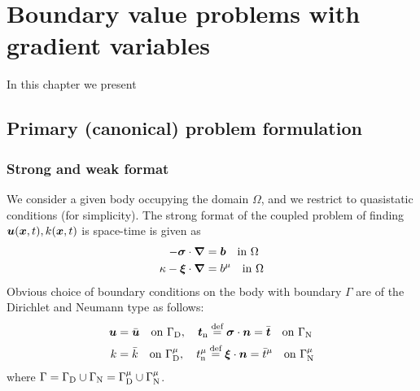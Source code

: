 
\chapter{Boundary value problems with gradient variables}


In this chapter we present 

\section{Primary (canonical) problem formulation}

\subsection{Strong and weak format}

We consider a given body occupying the domain $\Omega$, and we restrict to quasistatic conditions (for simplicity). The strong format of the coupled problem of finding $\u(\bm{x},t), k(\bm{x},t)$ is space-time is given as
\begin{subequations}\label{eq:8-208}
    \begin{align}
    - \stress\cdot\grad &= \bm{b} \quad
    \mbox{in }  \Omega
\label{eq:8-208a} \\
    \kappa - \bm{\xi}\cdot\grad &= b^\micro \quad
    \mbox{in }  \Omega
\label{eq:8-208b}
    \end{align}
\end{subequations}
Obvious choice of boundary conditions on the body with boundary $\Gamma$ are of the Dirichlet and Neumann type as follows:
\begin{subequations}\label{eq:8-308}
    \begin{align}
    \u &= \bbi{u} \quad \mbox{on }  \Gamma_{\mathrm D}, \quad \bm{t}_{\mathrm n}\defeq \stress\cdot\bm{n} = \bbi{t} \quad \mbox{on }  \Gamma_{\mathrm N}
\label{eq:8-308a} \\
    k &= \bar{k} \quad \mbox{on }  \Gamma_{\mathrm D}^\micro, \quad t_{\mathrm n}^\micro\defeq\bm{\xi}\cdot\bm{n} = \bar{t}^\micro \quad \mbox{on }  \Gamma_{\mathrm N}^\micro
\label{eq:8-308b}
    \end{align}

\end{subequations}
where $\Gamma=\Gamma_{\mathrm D}\cup\Gamma_{\mathrm N}=\Gamma_{\mathrm D}^\micro\cup\Gamma_{\mathrm N}^\micro$.

